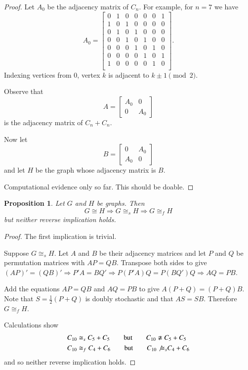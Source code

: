\documentclass[12pt]{article}
\newcommand{\iso}{\cong}
\newcommand{\siso}{\ensuremath{\iso_s}}
\newcommand{\fiso}{\iso_f}
\newtheorem{prop}{Proposition}
\begin{document}
\begin{proof}
  Let $A_0$ be the adjacency matrix of $C_n$. For example,
  for $n=7$ we have
  \[
  A_0 = 
  \left[
    \begin{array}{ccccccc}
      0 & 1 & 0 & 0 & 0 & 0 & 1 \\
      1 & 0 & 1 & 0 & 0 & 0 & 0 \\
      0 & 1 & 0 & 1 & 0 & 0 & 0 \\
      0 & 0 & 1 & 0 & 1 & 0 & 0 \\
      0 & 0 & 0 & 1 & 0 & 1 & 0 \\
      0 & 0 & 0 & 0 & 1 & 0 & 1 \\
      1 & 0 & 0 & 0 & 0 & 1 & 0 \\
    \end{array}
  \right] .
  \]
  Indexing vertices from $0$, vertex $k$ is adjacent to $k\pm1 \pmod2$.

  Observe that
  \[
  A =
  \begin{bmatrix}
    A_0 & 0 \\ 0 & A_0
  \end{bmatrix}
  \]
  is the adjacency matrix of $C_n+C_n$. 

  Now let 
  \[
  B = 
  \begin{bmatrix}
    0 & A_0 \\ A_0 & 0
  \end{bmatrix}
  \]
  and let $H$ be the graph whose adjacency matrix is $B$.

  Computational evidence only so far. This should be doable.
\end{proof}


\begin{prop}
  Let $G$ and $H$ be graphs. Then
  \[
  G\iso H \Rightarrow    G\siso H  \Rightarrow G\fiso H  
  \]
  but neither reverse implication holds. 
\end{prop}

\begin{proof}
  The first implication is trivial. 
    
  Suppose $G\siso H$. Let $A$ and $B$ be their adjacency matrices and
  let $P$ and $Q$ be permutation matrices with $AP=QB$. Transpose both
  sides to give $(AP)' = (QB)' \Rightarrow P'A = BQ' \Rightarrow
  P(P'A)Q = P(BQ')Q \Rightarrow AQ=PB$.
    
  Add the equations $AP=QB$ and $AQ=PB$ to give $A(P+Q)=(P+Q)B$. Note
  that $S=\frac12(P+Q)$ is doubly stochastic and that
  $AS=SB$. Therefore $G \fiso H$.

  Calculations show
  \[
  \begin{aligned}
    C_{10} &\siso C_5+C_5 \qquad\text{but}\qquad C_{10}\not\iso C_5+C_5 \\
    C_{10} &\fiso C_4+C_6 \qquad\text{but}\qquad C_{10}\not\siso C_4+C_6
  \end{aligned}
  \]
  and so neither reverse implication holds.
\end{proof}
\end{document}

